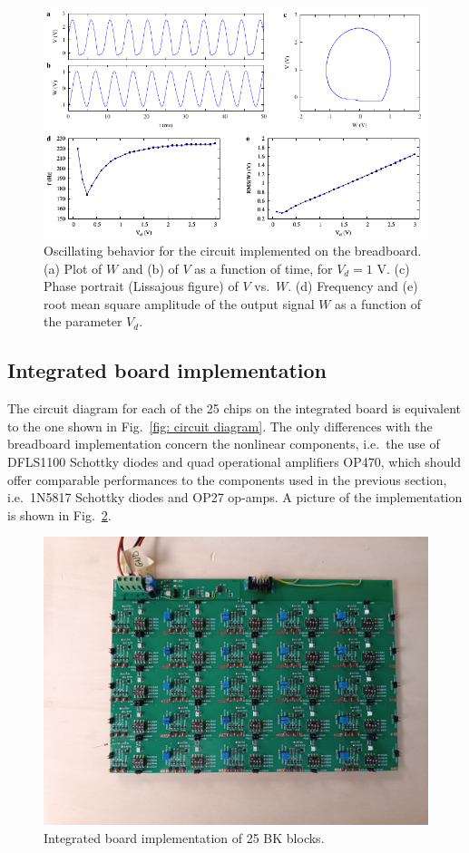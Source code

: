 \begin{figure}[!htbp]
    \centering
    \includegraphics[width=\linewidth]{../blocks/1_block/breadboard/single_block.pdf}
    \caption{Oscillating behavior for the circuit implemented on
    the breadboard. (a) Plot of $W$ and (b) of $V$ as a function of time,
    for $V_d=1$ V.
    (c) Phase portrait (Lissajous figure) of $V$ vs.\ $W$. (d)
    Frequency and (e) root mean square amplitude of the
    output signal $W$ as a function of the parameter $V_d$.
    }\label{fig:oscillation breadboard}
\end{figure}


\subsection{Integrated board implementation}\label{subsec:integrated board implementation}

The circuit diagram for each of the 25 chips on the integrated board is equivalent to the
one shown in Fig.~\ref{fig: circuit diagram}. The only differences with the breadboard implementation
concern the nonlinear components, i.e.\ the use of DFLS1100 Schottky diodes and quad operational
amplifiers OP470, which should offer comparable performances to the components used in the previous section,
i.e.\ 1N5817 Schottky diodes and OP27 op-amps.
A picture of the implementation is shown in Fig.~\ref{fig: photo integrated board}.

\begin{figure}[!htbp]
    \centering
        \includegraphics[width=.8\linewidth]{images/photo_integrated_board.jpeg}
        \caption{Integrated board implementation of 25 BK blocks.
        }\label{fig: photo integrated board}
\end{figure}

